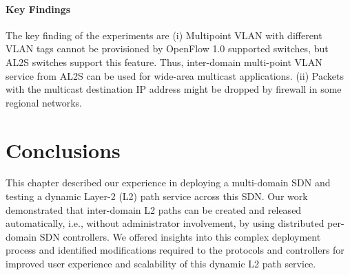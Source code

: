 \paragraph{Key Findings}
The key finding of the experiments are (i) Multipoint VLAN with different VLAN tags cannot be provisioned by OpenFlow 1.0 supported switches, but AL2S switches support this feature. Thus, inter-domain multi-point VLAN service from AL2S can be used for wide-area multicast applications. (ii) Packets with the multicast destination IP address might be dropped by firewall in some regional networks.


\section{Conclusions}
This chapter described our experience in deploying a multi-domain SDN and testing
a dynamic Layer-2 (L2) path service across this SDN. Our work demonstrated that inter-domain L2 paths can be created and released automatically, i.e., without administrator involvement, by using distributed per-domain SDN controllers.
We offered insights into this complex deployment process
and identified modifications required to the protocols and controllers
for improved user experience and scalability of this dynamic L2 path service.


